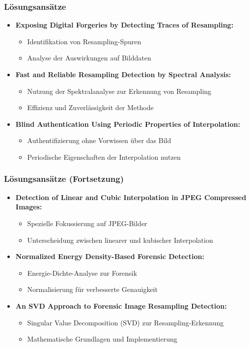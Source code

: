 \documentclass[11pt,t,usepdftitle=false,aspectratio=169]{beamer}
\begin{document}
\begin{frame}
	\frametitle{Lösungsansätze}
	\begin{itemize}
		\item \textbf{Exposing Digital Forgeries by Detecting Traces of Resampling:} 
		\begin{itemize}
			\item Identifikation von Resampling-Spuren
			\item Analyse der Auswirkungen auf Bilddaten
		\end{itemize}
		\item \textbf{Fast and Reliable Resampling Detection by Spectral Analysis:} 
		\begin{itemize}
			\item Nutzung der Spektralanalyse zur Erkennung von Resampling
			\item Effizienz und Zuverlässigkeit der Methode
		\end{itemize}
		\item \textbf{Blind Authentication Using Periodic Properties of Interpolation:} 
		\begin{itemize}
			\item Authentifizierung ohne Vorwissen über das Bild
			\item Periodische Eigenschaften der Interpolation nutzen
		\end{itemize}
	\end{itemize}
\end{frame}

\begin{frame}
	\frametitle{Lösungsansätze (Fortsetzung)}
	\begin{itemize}
		\item \textbf{Detection of Linear and Cubic Interpolation in JPEG Compressed Images:} 
		\begin{itemize}
			\item Spezielle Fokussierung auf JPEG-Bilder
			\item Unterscheidung zwischen linearer und kubischer Interpolation
		\end{itemize}
		\item \textbf{Normalized Energy Density-Based Forensic Detection:} 
		\begin{itemize}
			\item Energie-Dichte-Analyse zur Forensik
			\item Normalisierung für verbesserte Genauigkeit
		\end{itemize}
		\item \textbf{An SVD Approach to Forensic Image Resampling Detection:} 
		\begin{itemize}
			\item Singular Value Decomposition (SVD) zur Resampling-Erkennung
			\item Mathematische Grundlagen und Implementierung
		\end{itemize}
	\end{itemize}
\end{frame}
\end{document}
